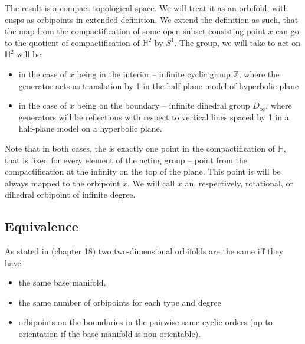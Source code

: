 The result is a compact topological space. We will treat it as an orbifold, with 
cusps as orbipoints in extended definition. 
We extend the definition as such, that the map from the compactification of 
some open subset consisting point $x$ can go to the quotient of compactification of 
$\mathbb{H}^2$ by $S^1$. The group, we will take to act on $\mathbb{H}^2$ will 
be:
\begin{itemize} 
\item in the case of $x$ being in the interior -- infinite cyclic group $\mathbb{Z}$, 
where the generator acts as translation by 1 
in the half-plane model of hyperbolic plane   
\item in the case of $x$ being on the boundary -- infinite dihedral group $D_\infty$, where 
generators will be reflections with respect to vertical lines spaced by 1 in a half-plane 
model on a hyperbolic plane.
\end{itemize}

Note that in both cases, the is exactly one point in the compactification of $\mathbb{H}$, that is 
fixed for every element of the acting group -- point from the compactification at 
the infinity on the top of the plane. This point is will be always mapped to the orbipoint $x$. 
We will call $x$ an, respectively, rotational, or dihedral orbipoint of infinite degree.


\subsection{Equivalence}\label{sameness}
As stated in \cite{Conway16} (chapter 18) two two-dimensional orbifolds are the same iff they have:
\begin{itemize}
\item the same base manifold, 
\item the same number of orbipoints for each type and degree 
\item orbipoints on the boundaries 
in the pairwise same cyclic orders (up to orientation if the base manifold is non-orientable).
\end{itemize}

